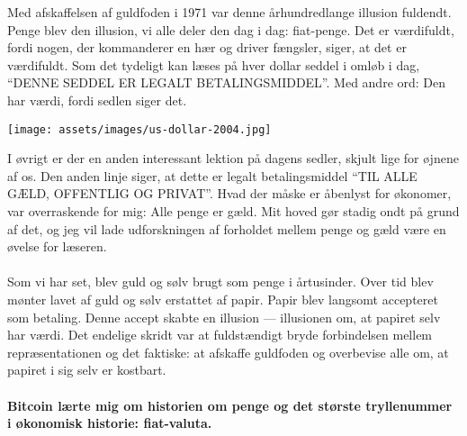 Med afskaffelsen af guldfoden i 1971 var denne århundredlange
illusion fuldendt. Penge blev den illusion, vi alle deler den dag i dag: fiat-penge.
Det er værdifuldt, fordi nogen, der kommanderer en hær og driver fængsler, siger, at
det er værdifuldt. Som det tydeligt kan læses på hver dollar seddel i omløb i dag,
\enquote{DENNE SEDDEL ER LEGALT BETALINGSMIDDEL}. Med andre ord: Den har værdi, fordi sedlen siger det.

\begin{center}
  \centering
  \texttt{[image: assets/images/us-dollar-2004.jpg]}
  \label{fig:us-dollar-2004}
\end{center}
  
I øvrigt er der en anden interessant lektion på dagens sedler,
skjult lige for øjnene af os. Den anden linje siger, at dette er legalt betalingsmiddel
\enquote{TIL ALLE GÆLD, OFFENTLIG OG PRIVAT}. Hvad der måske er åbenlyst for økonomer,
var overraskende for mig: Alle penge er gæld. Mit hoved gør stadig ondt
på grund af det, og jeg vil lade udforskningen af forholdet mellem penge
og gæld være en øvelse for læseren.

\paragraph{}
Som vi har set, blev guld og sølv brugt som penge i årtusinder. Over tid
blev mønter lavet af guld og sølv erstattet af papir. Papir
blev langsomt accepteret som betaling. Denne accept skabte en
illusion --- illusionen om, at papiret selv har værdi. Det endelige
skridt var at fuldstændigt bryde forbindelsen mellem repræsentationen og
det faktiske: at afskaffe guldfoden og overbevise alle om, at
papiret i sig selv er kostbart.

\paragraph{Bitcoin lærte mig om historien om penge og det største tryllenummer
i økonomisk historie: fiat-valuta.}

%
%
%
%
